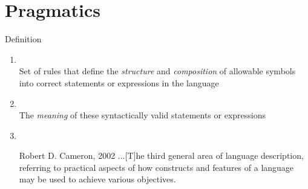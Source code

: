 
\section{Pragmatics}

\begin{csecframe}{Definition}

    \begin{enumerate}
        \itemsep1em
        \item {}\\
            Set of rules that define the \textit{structure} and \textit{composition}
            of allowable symbols into correct statements or expressions in the language

        \item {}\\
            The \textit{meaning} of these syntactically valid statements or expressions

        \item {}\\[3pt]
            \begin{aquote}{Robert D. Cameron, 2002}
                ...[T]he third general area of language description, referring
                to practical aspects of how constructs and features of a language may be used to
                achieve various objectives.
            \end{aquote}
    \end{enumerate}

\end{csecframe}

